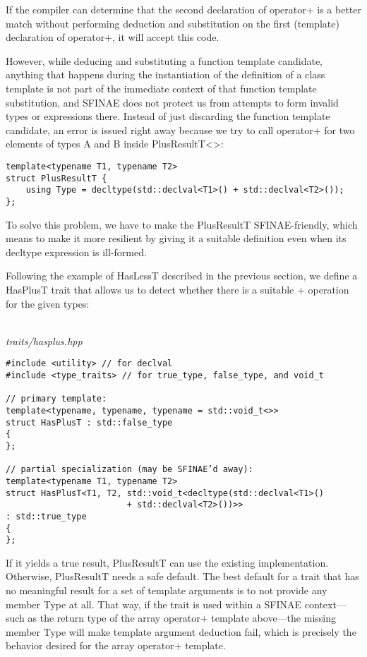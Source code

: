 If the compiler can determine that the second declaration of operator+ is a better match without performing deduction and substitution on the first (template) declaration of operator+, it will accept
this code.

However, while deducing and substituting a function template candidate, anything that happens during the instantiation of the definition of a class template is not part of the immediate context of that function template substitution, and SFINAE does not protect us from attempts to form invalid types or expressions there. Instead of just discarding the function template candidate, an error is issued right away because we try to call operator+ for two elements of types A and B inside PlusResultT<>:

\begin{lstlisting}[style=styleCXX]
template<typename T1, typename T2>
struct PlusResultT {
	using Type = decltype(std::declval<T1>() + std::declval<T2>());
};
\end{lstlisting}

To solve this problem, we have to make the PlusResultT SFINAE-friendly, which means to make it more resilient by giving it a suitable definition even when its decltype expression is ill-formed.

Following the example of HasLessT described in the previous section, we define a HasPlusT trait that allows us to detect whether there is a suitable + operation for the given types:

\hspace*{\fill} \\ %
\noindent
\textit{traits/hasplus.hpp}
\begin{lstlisting}[style=styleCXX]
#include <utility> // for declval
#include <type_traits> // for true_type, false_type, and void_t

// primary template:
template<typename, typename, typename = std::void_t<>>
struct HasPlusT : std::false_type
{
};

// partial specialization (may be SFINAE’d away):
template<typename T1, typename T2>
struct HasPlusT<T1, T2, std::void_t<decltype(std::declval<T1>()
						+ std::declval<T2>())>>
: std::true_type
{
};
\end{lstlisting}

If it yields a true result, PlusResultT can use the existing implementation. Otherwise, PlusResultT needs a safe default. The best default for a trait that has no meaningful result for a set of template arguments is to not provide any member Type at all. That way, if the trait is used within a SFINAE context—such as the return type of the array operator+ template above—the missing member Type will make template argument deduction fail, which is precisely the behavior desired for the array operator+ template.

